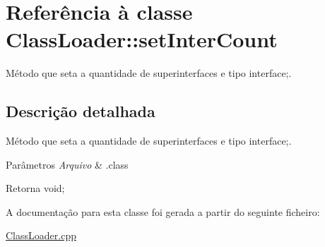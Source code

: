 \hypertarget{class_class_loader_1_1set_inter_count}{}\section{Referência à classe Class\+Loader\+:\+:set\+Inter\+Count}
\label{class_class_loader_1_1set_inter_count}


Método que seta a quantidade de superinterfaces e tipo interface;.  




\subsection{Descrição detalhada}
Método que seta a quantidade de superinterfaces e tipo interface;. 


\begin{DoxyParams}{Parâmetros}
{\em Arquivo} & .class \\
\hline
\end{DoxyParams}
\begin{DoxyReturn}{Retorna}
void; 
\end{DoxyReturn}


A documentação para esta classe foi gerada a partir do seguinte ficheiro\+:\begin{DoxyCompactItemize}
\item 
\hyperlink{_class_loader_8cpp}{Class\+Loader.\+cpp}\end{DoxyCompactItemize}
